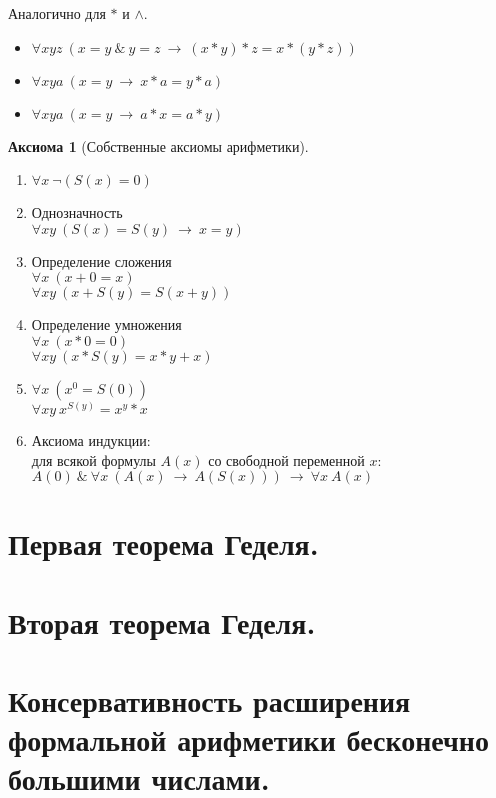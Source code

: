 \documentclass[a4paper,12pt]{article}
\theoremstyle{definition} %
\newtheorem{axiom}{Аксиома}[section]
\theoremstyle{definition} %
\theoremstyle{remark} %
\begin{document}
	Аналогично для $*$ и $\wedge$.
	
	\begin{itemize}
		\item $\forall xyz \ (x = y \ \& \ y = z \ \rightarrow \ (x * y) * z = x * (y * z))$
		\item $\forall xya \ (x = y \ \rightarrow \ x * a = y * a)$
		\item $\forall xya \ (x = y \ \rightarrow \ a * x = a * y)$
	\end{itemize}

	\begin{axiom}[Собственные аксиомы арифметики]\
		\begin{enumerate}
			\item $\forall x \ \neg (S(x) = 0)$
			\item Однозначность \\[1ex]
			$\forall xy \ (S(x) = S(y) \ \rightarrow \ x = y)$
			\item Определение сложения \\[1ex]
			$\forall x \ (x + 0 = x)$ \\[1ex]
			$\forall xy \ (x + S(y) = S(x + y))$
			\item Определение умножения \\[1ex]
			$\forall x \ (x * 0 = 0)$ \\[1ex]
			$\forall xy \ (x * S(y) = x * y + x)$
			\item $\forall x \ (x^0 = S(0))$ \\[1ex]
			$\forall xy \ x^{S(y)} = x^y * x$
			\item Аксиома индукции: \\[1ex]
			для всякой формулы $A(x)$ со свободной переменной $x$: \\[1ex]
			$A(0) \ \& \ \forall x \ (A(x) \ \rightarrow \ A(S(x))) \ \rightarrow \ \forall x \ A(x)$
		\end{enumerate}
	\end{axiom}

\section{Первая теорема Геделя.}

\section{Вторая теорема Геделя.}

\section{Консервативность расширения формальной арифметики бесконечно большими числами.}
\end{document}
